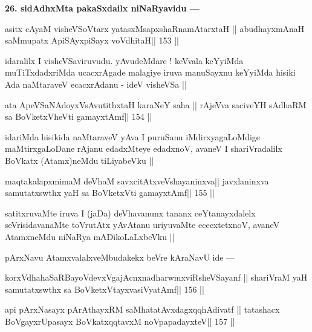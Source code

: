 \begin{artha}
{\bf 26. sidAdhxMta pakaSxdailx niNaRyavidu ---}
\end{artha}

\begin{shl}
asitx cAyaM visheVSoV\s tarx yatasxMsapxshaRnamAtarxtaH ||
abudhayxmAnaH saMmupatx ApiSAyx\s\s piSayx voVdhitaH\hfill || 153 ||
\end{shl}

\begin{artha}
idaralilx I visheVSaviruvudu. yAvudeMdare ! keVvala keYyiMda muTiTxdadxriMda ucacxrAgade malagiye iruva manuSayxnu keYyiMda hisiki Ada naMtaraveV ecacxrAdanu - ideV visheVSa ||
\end{artha}

\begin{shl}
ata ApeVSaNAdoyxV\s sAvutithxtaH karaNeY saha ||
rAjeVva saciveYH sAdhaRM sa BoVketxVheVti gamayxtAmf\hfill || 154 ||
\end{shl}

\begin{artha}
idariMda hisikida naMtaraveV yAva I puruSanu iMdirxyagaLoMdige maMtirxgaLoDane rAjanu edadxMteye edadxnoV, avaneV I shariVradalilx BoVkatx (Atamx)neMdu tiLiyabeVku ||
\end{artha}

\begin{shl}
maqtakalapxmimaM deVhaM savxcitAtxveVshayaninxva\footnotemark[7] ||
javxlaninxva samutatxswthx yaH sa BoVketxVti gamayxtAmf\hfill || 155 ||
\end{shl}

\begin{artha}
satitxruvaMte iruva I (jaDa) deVhavanunx tananx ceYtanayxdalelx seVrisidavanaMte toVrutAtx yAvAtanu uriyuvaMte ececxtetxnoV, avaneV AtamxneMdu niNaRya mADikoLaLxbeVku ||
\end{artha}

\begin{artha}
pArxNavu AtamxvalalxveMbudakekx beVre kAraNavU ide ---
\end{artha}

\begin{shl}
korxVdhahaSaRBayoVdevxVgajAcnxnadharwmxviRsheVSayanf ||
shariVraM yaH samutatxswthx sa BoVketxVtayxvasiVyatAmf\hfill || 156 ||
\end{shl}

\begin{shl}
api pArxNasayx pArAthayxRM saMhatatAvxdagxqqhAdivatf ||
tatashacx BoVgayxrUpasayx BoVkatxqqtavxM noVpapadayxteV\hfill || 157 ||
\end{shl}

